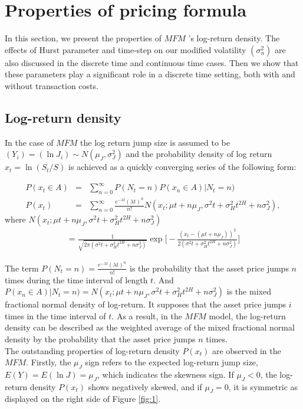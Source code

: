 \documentclass[a4paper,11pt]{amsart}
\numberwithin{equation}{section}
\theoremstyle{definition}
\theoremstyle{plain}
\theoremstyle{definition}
\newcommand{\1}{\mathbf{1}}
\begin{document}
\section{Properties of pricing formula}\label{sec:3}

In this section, we present the properties of $MFM$ 's log-return density. The effects of Hurst parameter and time-step on our modified volatility $(\sigma^2_n)$ are also discussed  in the discrete time and continuous time cases. Then we show that these parameters play a significant role in a discrete time setting, both with and without transaction costs.
\subsection{Log-return density}


In the case of $MFM$ the log return jump size is assumed to be $(Y_i)=(\ln J_i)\sim N(\mu_J,\sigma_J^2)$ and the probability density of log return $x_t=\ln (S_t/S)$ is achieved as a quickly converging series of the following form:

\begin{eqnarray}
P(x_t\in A)&=&\sum_{n=0}^\infty P(N_t=n)P(x_n\in A)|N_t=n)\nonumber\\
P(x_t)&=&\sum_{n=0}^\infty\frac{e^{-\lambda t}(\lambda t)^n}{n!}N(x_t;\mu t+n\mu_J,\sigma^2t+\sigma_H^2t^{2H}+n\sigma_J^2),
\label{eq:10-1}
\end{eqnarray}
where $N(x_t;\mu t+n\mu_J,\sigma^2t+\sigma_H^2t^{2H}+n\sigma_J^2)$
\begin{eqnarray}
=\frac{1}{\sqrt{2\pi(\sigma^2t+\sigma_H^2t^{2H}+n\sigma_J^2)}}\exp\Big[-\frac{(x_t-(\mu t+n\mu_J)
)^2}{2(\sigma^2t+\sigma_H^2t^{2H}+n\sigma_J^2)}\Big]
\label{eq:10-2}
\end{eqnarray}

The term $P(N_t=n)=\frac{e^{-\lambda t}(\lambda t)^n}{n!}$ is the probability that the asset price jumps $n$ times during the time interval of length $t$. And $P(x_n\in A)|N_t=n)=N(x_t;\mu t+n\mu_J,\sigma^2t+\sigma_H^2t^{2H}+n\sigma_J^2)$
is the mixed fractional normal density of log-return. It supposes that the asset price jumps $i$ times in the time interval of $t$. As a result, in the $MFM$ model, the log-return density can be described as the weighted average of the mixed fractional normal density by the probability that the asset price jumps $n$ times.\\

 The outstanding properties of log-return density $P(x_t)$ are observed in the $MFM$. Firstly, the  $\mu_J$ sign refers to the expected log-return jump size, $E(Y)=E(\ln J)=\mu_J$, which indicates the skewness sign. If $\mu_J<0$, the log-return density $P(x_t)$ shows negatively skewed, and if $\mu_J=0$, it is  symmetric as displayed on the right side of Figure \ref{fig:1}.
\end{document}
